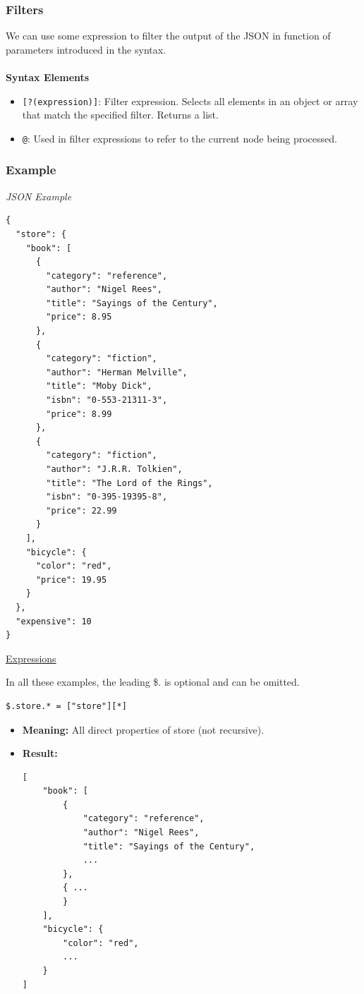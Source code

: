 \documentclass{article}
\newenvironment{blocktemplate}[1]{%
    \tcolorbox[beamer,%
    noparskip,breakable,
    colframe=Blue,%
    colbacklower=LimeGreen!75!LightGreen,%
    title=#1]}%
    {\endtcolorbox}
\newenvironment{codetemplate}[1][]{%
  \mybasecolorbox[#1]
  \itshape
}{%
  \endmybasecolorbox
}
\begin{document}
\subsubsection{Filters}
We can use some expression to filter the output of the JSON in function of parameters introduced in the syntax.
\\
\\
\textbf{Syntax Elements}
\begin{itemize}
    \item \verb|[?(expression)]|: Filter expression. Selects all elements in an object or array that match the specified filter. Returns a list.
    \item \verb|@|: Used in filter expressions to refer to the current node being processed.
\end{itemize}

\subsubsection{Example}
\begin{codetemplate}{JSON Example}
\begin{verbatim}
{
  "store": {
    "book": [
      {
        "category": "reference",
        "author": "Nigel Rees",
        "title": "Sayings of the Century",
        "price": 8.95
      },
      {
        "category": "fiction",
        "author": "Herman Melville",
        "title": "Moby Dick",
        "isbn": "0-553-21311-3",
        "price": 8.99
      },
      {
        "category": "fiction",
        "author": "J.R.R. Tolkien",
        "title": "The Lord of the Rings",
        "isbn": "0-395-19395-8",
        "price": 22.99
      }
    ],
    "bicycle": {
      "color": "red",
      "price": 19.95
    }
  },
  "expensive": 10
}
\end{verbatim}
\end{codetemplate}

\underline{Expressions}

\begin{blocktemplate}{Nota}
In all these examples, the leading \$. is optional and can be omitted.
\end{blocktemplate}

\begin{codetemplate}{}
\begin{verbatim}
$.store.* = ["store"][*]
\end{verbatim}
\end{codetemplate}
\begin{itemize}
    \item \textbf{Meaning:} All direct properties of store (not recursive).
    \item \textbf{Result:}
\begin{verbatim}
[
    "book": [
        {
            "category": "reference",
            "author": "Nigel Rees",
            "title": "Sayings of the Century",
            ...
        },
        { ...
        }
    ],
    "bicycle": {
        "color": "red",
        ...
    }
]
\end{verbatim}
\end{itemize}
\end{document}
